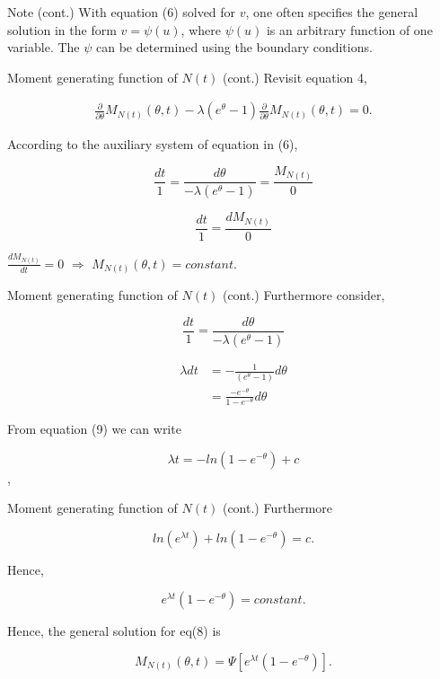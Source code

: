 \documentclass[12pt,ignorenonframetext,]{beamer}
\begin{document}
\begin{frame}
\begin{block}{Note (cont.)}
\protect\hypertarget{note-cont.}{}
With equation (6) solved for \(v\), one often specifies the general
solution in the form \(v=\psi(u)\), where \(\psi(u)\) is an arbitrary
function of one variable. The \(\psi\) can be determined using the
boundary conditions.
\end{block}
\end{frame}

\begin{frame}{Moment generating function of \(N(t)\) (cont.)}
\protect\hypertarget{moment-generating-function-of-nt-cont.-4}{}
Revisit equation 4,

\begin{equation}
\begin{split}
\frac{\partial}{\partial \theta}M_{N(t)}(\theta, t) - \lambda (e^{\theta} - 1)\frac{\partial}{\partial \theta}M_{N(t)}(\theta, t) = 0.
\end{split}
\end{equation}

According to the auxiliary system of equation in (6),

\[\frac{dt}{1}=\frac{d\theta}{-\lambda(e^{\theta}-1)}=\frac{M_{N(t)}}{0}\]

\[\frac{dt}{1} = \frac{dM_{N(t)}}{0}\]

\(\frac{dM_{N(t)}}{dt}=0\) \(\Rightarrow\)
\(M_{N(t)}(\theta, t) = constant.\)
\end{frame}

\begin{frame}{Moment generating function of \(N(t)\) (cont.)}
\protect\hypertarget{moment-generating-function-of-nt-cont.-5}{}
Furthermore consider,

\[\frac{dt}{1} = \frac{d\theta}{-\lambda(e^{\theta}-1)}\]

\begin{equation}
\begin{split}
\lambda dt &= -\frac{1}{(e^{\theta}-1)} d\theta \\
&= \frac{-e^{-\theta}}{1-e^{-\theta}}d\theta 
\end{split}
\end{equation}

From equation (9) we can write

\[\lambda t = -ln(1-e^{-\theta}) + c\],
\end{frame}

\begin{frame}{Moment generating function of \(N(t)\) (cont.)}
\protect\hypertarget{moment-generating-function-of-nt-cont.-6}{}
Furthermore

\[ln (e^{\lambda t}) + ln(1-e^{-\theta}) = c.\]

Hence,

\[e^{\lambda t}(1-e^{-\theta}) = constant.\]

Hence, the general solution for eq(8) is

\[M_{N(t)}(\theta, t)= \Psi [e^{\lambda t}(1-e^{-\theta})].\]
\end{frame}
\end{document}
